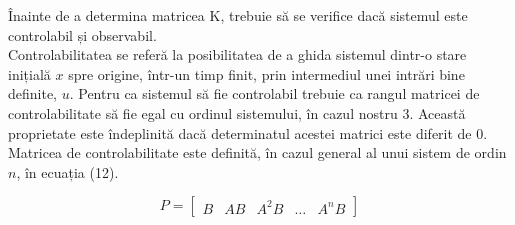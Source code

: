 \documentclass[11pt]{article}
\begin{document}
Înainte de a determina matricea K, trebuie să se verifice dacă sistemul este controlabil și observabil.\\
Controlabilitatea se referă la posibilitatea de a ghida sistemul dintr-o stare inițială $x$ spre origine, într-un timp finit, prin intermediul unei intrări bine definite, $u$.
Pentru ca sistemul să fie controlabil trebuie ca rangul matricei de controlabilitate să fie egal cu ordinul sistemului, în cazul nostru 3. Această proprietate este îndeplinită dacă determinatul acestei matrici este diferit de 0.
Matricea de controlabilitate este definită, în cazul general al unui sistem de ordin $n$, în ecuația (12).

\begin{equation}
	P=\begin{bmatrix}
	B      & AB & A^2B& \dots&A^nB
	\end{bmatrix}	
\end{equation}
\end{document}
